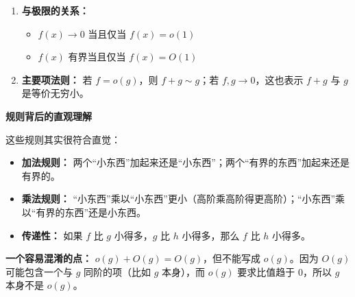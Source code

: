 \documentclass[fontset=fandol]{ctexart}
\newenvironment{custom}[1]{\par\noindent\textbf{#1}\quad}{\par\vspace{0.8em}}
\begin{document}
\begin{theorem}[小 \(o\) 与大 \(O\) 的运算性质]
\begin{enumerate}
\begin{itemize}
   \item 若 \(f = o(g)\) 且 \(g = O(h)\)，则 \(f = o(h)\)

   \end{itemize}



\item \textbf{与极限的关系：}

   \begin{itemize}

   \item \(f(x) \to 0\) 当且仅当 \(f(x) = o(1)\)

   \item \(f(x)\) 有界当且仅当 \(f(x) = O(1)\)

   \end{itemize}



\item \textbf{主要项法则：} 若 \(f=o(g)\)，则 \(f+g\sim g\)；若 \(f,g\to0\)，这也表示 \(f+g\) 与 \(g\) 是等价无穷小。

\end{enumerate}

\end{theorem}



\begin{custom}{规则背后的直观理解}



这些规则其实很符合直觉：



\begin{itemize}

\item \textbf{加法规则：} 两个“小东西”加起来还是“小东西”；两个“有界的东西”加起来还是有界的。

\item \textbf{乘法规则：} “小东西”乘以“小东西”更小（高阶乘高阶得更高阶）；“小东西”乘以“有界的东西”还是小东西。

\item \textbf{传递性：} 如果 \(f\) 比 \(g\) 小得多，\(g\) 比 \(h\) 小得多，那么 \(f\) 比 \(h\) 小得多。

\end{itemize}



\textbf{一个容易混淆的点：} \(o(g) + O(g) = O(g)\)，但不能写成 \(o(g)\)。因为 \(O(g)\) 可能包含一个与 \(g\) 同阶的项（比如 \(g\) 本身），而 \(o(g)\) 要求比值趋于 0，所以 \(g\) 本身不是 \(o(g)\)。

\end{custom}
\end{document}
